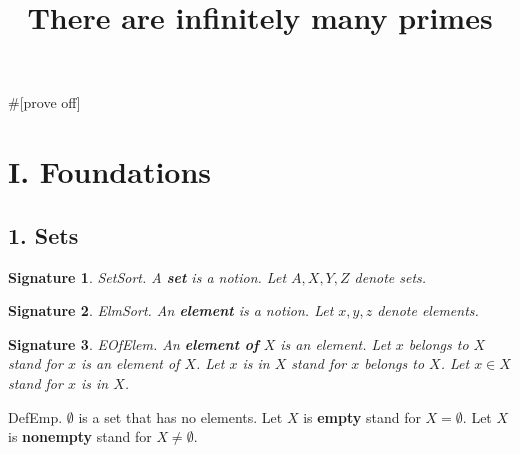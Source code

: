\newtheorem{signature}{Signature}
\newtheorem{axiom}{Axiom}
\newtheorem{signaturep}{Signature}
\newtheorem{axiomp}{Axiom}
\newtheorem{definitionp}{Definition}
\newtheorem{theoremp}{Theorem}
\newtheorem{lemmap}{Lemma}
 
\newcommand{\power}{{\cal P}} 
\newcommand{\preimg}[2]{{#1}^{-1}[#2]} 
\newcommand{\Seq}[1]{\{1,\dots,#1\}}
\newcommand{\Set}[2]{\{#1_1,\dots,#1_{#2}\}}
\newcommand{\Product}[2]{\prod_{i=1}^{#2}{#1}_i}
\newcommand{\subfunc}[2]{{#1}_{#2}}
\newcommand{\CC}{{\Bbb C}}
\newcommand{\RR}{{\Bbb R}}
\newcommand{\QQ}{{\Bbb Q}}
\newcommand{\ZZ}{{\Bbb Z}} 
\newcommand{\NN}{{\Bbb N}}
\newcommand{\NNplus}{{\Bbb N}^+}

#[prove off]

\title{There are infinitely many primes}
\maketitle
\section{I. Foundations}


\subsection{1. Sets}


\begin{signature} SetSort.  A {\bf set} is a notion.
Let $A,X,Y,Z$ denote sets.
\end{signature}

\begin{signature} ElmSort.  
An {\bf element} is a notion.
Let $x,y,z$ denote elements.
\end{signature}

\begin{signature} EOfElem.  
An {\bf element of} $X$ is an element.
Let $x$ belongs to $X$ stand for $x$ is an element of $X$.
Let $x$ is in $X$ stand for $x$ belongs to $X$.
Let $x \in X$ stand for $x$ is in $X$.
\end{signature}

\begin{definition} DefEmp.
$\emptyset$ is a set that has no elements.
Let $X$ is {\bf empty} stand for $X = \emptyset$.
Let $X$ is {\bf nonempty} stand for $X \neq \emptyset$.
\end{definition}

